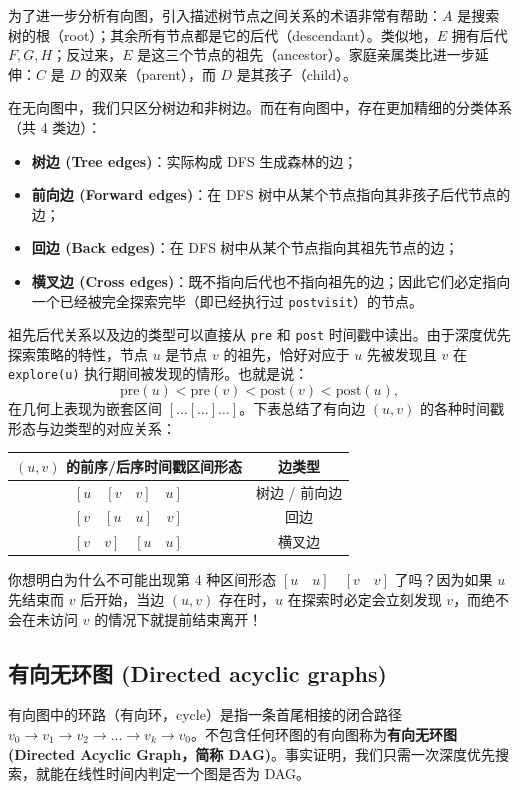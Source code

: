 为了进一步分析有向图，引入描述树节点之间关系的术语非常有帮助：$A$ 是搜索树的根（root）；其余所有节点都是它的后代（descendant）。类似地，$E$ 拥有后代 $F, G, H$；反过来，$E$ 是这三个节点的祖先（ancestor）。家庭亲属类比进一步延伸：$C$ 是 $D$ 的双亲（parent），而 $D$ 是其孩子（child）。

在无向图中，我们只区分树边和非树边。而在有向图中，存在更加精细的分类体系（共 4 类边）：
\begin{itemize}
    \item \textbf{树边 (Tree edges)}：实际构成 DFS 生成森林的边；
    \item \textbf{前向边 (Forward edges)}：在 DFS 树中从某个节点指向其非孩子后代节点的边；
    \item \textbf{回边 (Back edges)}：在 DFS 树中从某个节点指向其祖先节点的边；
    \item \textbf{横叉边 (Cross edges)}：既不指向后代也不指向祖先的边；因此它们必定指向一个已经被完全探索完毕（即已经执行过 \texttt{postvisit}）的节点。
\end{itemize}

祖先后代关系以及边的类型可以直接从 \texttt{pre} 和 \texttt{post} 时间戳中读出。由于深度优先探索策略的特性，节点 $u$ 是节点 $v$ 的祖先，恰好对应于 $u$ 先被发现且 $v$ 在 \texttt{explore(u)} 执行期间被发现的情形。也就是说：
\[
\text{pre}(u) < \text{pre}(v) < \text{post}(v) < \text{post}(u),
\]
在几何上表现为嵌套区间 $[ \dots [ \dots ] \dots ]$。下表总结了有向边 $(u, v)$ 的各种时间戳形态与边类型的对应关系：

\begin{center}
\begin{tabular}{cc}
\hline
$(u, v)$ 的前序/后序时间戳区间形态 & 边类型 \\
\hline
$[u \quad [v \quad v] \quad u]$ & 树边 / 前向边 \\
$[v \quad [u \quad u] \quad v]$ & 回边 \\
$[v \quad v] \quad [u \quad u]$ & 横叉边 \\
\hline
\end{tabular}
\end{center}
你想明白为什么不可能出现第 4 种区间形态 $[u \quad u] \quad [v \quad v]$ 了吗？因为如果 $u$ 先结束而 $v$ 后开始，当边 $(u, v)$ 存在时，$u$ 在探索时必定会立刻发现 $v$，而绝不会在未访问 $v$ 的情况下就提前结束离开！

\subsection{有向无环图 (Directed acyclic graphs)}
有向图中的环路（有向环，cycle）是指一条首尾相接的闭合路径 $v_0 \to v_1 \to v_2 \to \dots \to v_k \to v_0$。不包含任何环图的有向图称为\textbf{有向无环图 (Directed Acyclic Graph，简称 DAG)}。事实证明，我们只需一次深度优先搜索，就能在线性时间内判定一个图是否为 DAG。

